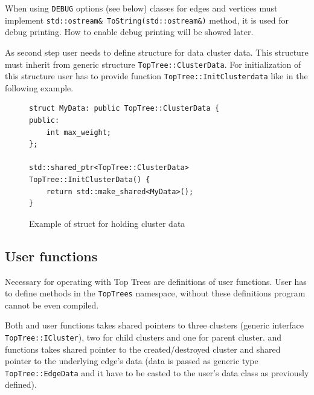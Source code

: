 When using \texttt{DEBUG} options (see below) classes for edges and vertices
must implement \texttt{std::ostream\& ToString(std::ostream\&)} method, it is
used for debug printing. How to enable debug printing will be showed later.

As second step user needs to define structure for data cluster data. This
structure must inherit from generic structure \texttt{TopTree::ClusterData}.
For initialization of this structure user has to provide function
\texttt{TopTree::InitClusterdata} like in the following example.

\begin{figure}[H]
\begin{verbatim}
struct MyData: public TopTree::ClusterData {
public:
    int max_weight;
};

std::shared_ptr<TopTree::ClusterData> TopTree::InitClusterData() {
    return std::make_shared<MyData>();
}
\end{verbatim}
\caption{Example of struct for holding cluster data}
\end{figure}

\subsection{User functions}

Necessary for operating with Top Trees are definitions of user functions. User
has to define methods in the \texttt{TopTrees} namespace, without these
definitions program cannot be even compiled.

Both \Join{} and \Split{} user functions takes shared pointers to three clusters
(generic interface \texttt{TopTree::ICluster}), two for child clusters and one
for parent cluster.
\Create{} and \Destroy{} functions takes shared pointer to the created/destroyed
cluster and shared pointer to the underlying edge's data (data is passed as
generic type \texttt{TopTree::EdgeData} and it have to be casted to the user's
data class as previously defined).

